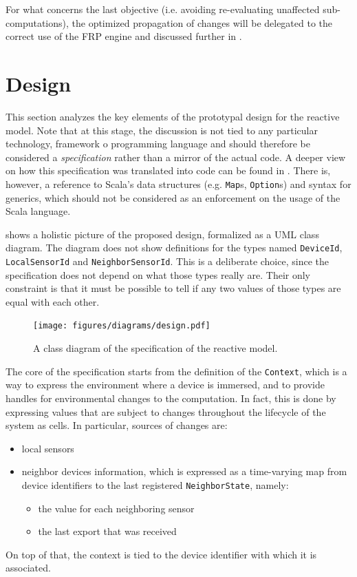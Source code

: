 For what concerns the last objective (i.e. avoiding re-evaluating unaffected sub-computations), the optimized propagation of changes will be delegated to the correct use of the FRP engine and discussed further in .

\section{Design}
\label{sec:design}

This section analyzes the key elements of the prototypal design for the reactive model.
%
Note that at this stage, the discussion is not tied to any particular technology, framework o programming language and should therefore be considered a \textit{specification} rather than a mirror of the actual code.
%
A deeper view on how this specification was translated into code can be found in .
% 
There is, however, a reference to Scala's data structures (e.g. \texttt{Map}s, \texttt{Option}s) and syntax for generics, which should not be considered as an enforcement on the usage of the Scala language.

 shows a holistic picture of the proposed design, formalized as a UML class diagram.
%
The diagram does not show definitions for the types named \texttt{DeviceId}, \texttt{LocalSensorId} and \texttt{NeighborSensorId}.
%
This is a deliberate choice, since the specification does not depend on what those types really are.
%
Their only constraint is that it must be possible to tell if any two values of those types are equal with each other.
%
\begin{figure}
    \centering
    \texttt{[image: figures/diagrams/design.pdf]}
    \caption{A class diagram of the specification of the reactive model.}
    \label{fig:class-diagram}
\end{figure}

The core of the specification starts from the definition of the \texttt{Context}, which is a way to express the environment where a device is immersed, and to provide handles for environmental changes to the computation.
%
In fact, this is done by expressing values that are subject to changes throughout the lifecycle of the system as cells.
%
In particular, sources of changes are:
%
\begin{itemize}
    \item local sensors
    \item neighbor devices information, which is expressed as a time-varying map from device identifiers to the last registered \texttt{NeighborState}, namely:
    \begin{itemize}
        \item the value for each neighboring sensor
        \item the last export that was received
    \end{itemize}
\end{itemize}
%
On top of that, the context is tied to the device identifier with which it is associated.

